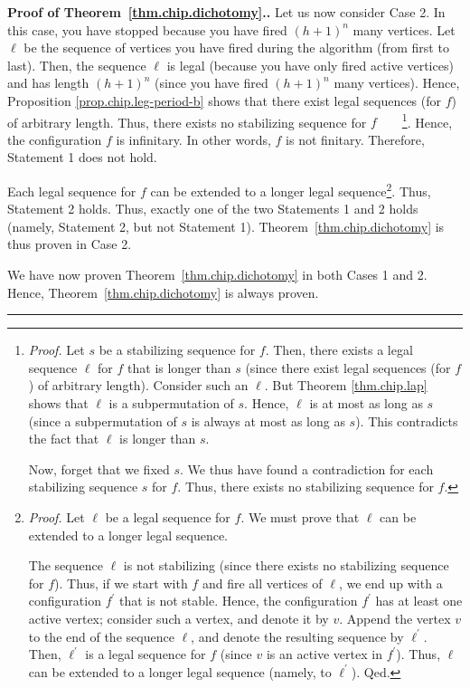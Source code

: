 \documentclass[numbers=enddot,12pt,final,onecolumn,notitlepage]{scrartcl}%
\theoremstyle{definition}
\newenvironment{proof}[1][Proof]{\noindent\textbf{#1.} }{\ \rule{0.5em}{0.5em}}
\begin{document}
\begin{proof}[Proof of Theorem~\ref{thm.chip.dichotomy}.]
Let us now consider Case 2. In this case, you have stopped because you have
fired $\left(  h+1\right)  ^{n}$ many vertices. Let $\ell$ be the sequence of
vertices you have fired during the algorithm (from first to last). Then, the
sequence $\ell$ is legal (because you have only fired active vertices) and has
length $\left(  h+1\right)  ^{n}$ (since you have fired $\left(  h+1\right)
^{n}$ many vertices). Hence, Proposition \ref{prop.chip.leg-period-b} shows
that there exist legal sequences (for $f$) of arbitrary length. Thus, there
exists no stabilizing sequence for $f$\ \ \ \ \footnote{\textit{Proof.} Let
$s$ be a stabilizing sequence for $f$. Then, there exists a legal sequence
$\ell$ for $f$ that is longer than $s$ (since there exist legal sequences (for
$f$) of arbitrary length). Consider such an $\ell$. But Theorem
\ref{thm.chip.lap} shows that $\ell$ is a subpermutation of $s$. Hence, $\ell$
is at most as long as $s$ (since a subpermutation of $s$ is always at most as
long as $s$). This contradicts the fact that $\ell$ is longer than $s$.
\par
Now, forget that we fixed $s$. We thus have found a contradiction for each
stabilizing sequence $s$ for $f$. Thus, there exists no stabilizing sequence
for $f$.}. Hence, the configuration $f$ is infinitary.
In other words, $f$ is not finitary. Therefore,
Statement 1 does not hold.

Each legal sequence for $f$ can be extended to a longer legal
sequence\footnote{\textit{Proof.} Let $\ell$ be a legal sequence for $f$. We
must prove that $\ell$ can be extended to a longer legal sequence.
\par
The sequence $\ell$ is not stabilizing (since there exists no stabilizing
sequence for $f$). Thus, if we start with $f$ and fire all vertices of $\ell$,
we end up with a configuration $f^{\prime}$ that is not stable. Hence, the
configuration $f^{\prime}$ has at least one active vertex; consider such a
vertex, and denote it by $v$. Append the vertex $v$ to the end of the sequence
$\ell$, and denote the resulting sequence by $\ell^{\prime}$. Then,
$\ell^{\prime}$ is a legal sequence for $f$ (since $v$ is an active vertex in
$f^{\prime}$). Thus, $\ell$ can be extended to a longer legal sequence
(namely, to $\ell^{\prime}$). Qed.}. Thus, Statement 2 holds. Thus, exactly
one of the two Statements 1 and 2 holds (namely, Statement 2, but not
Statement 1). Theorem~\ref{thm.chip.dichotomy} is thus proven in Case 2.

We have now proven Theorem~\ref{thm.chip.dichotomy} in both Cases 1 and 2.
Hence, Theorem~\ref{thm.chip.dichotomy} is always proven.
\end{proof}
\end{document}

